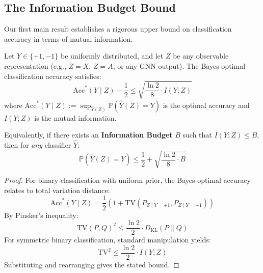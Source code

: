 \subsection{The Information Budget Bound}
\label{subsec:budget_bound}

Our first main result establishes a rigorous upper bound on classification accuracy in terms of mutual information.

\begin{theorem}
\label{thm:budget_pinsker}
Let $Y \in \{+1, -1\}$ be uniformly distributed, and let $Z$ be any observable representation (e.g., $Z = X$, $Z = A$, or any GNN output). The Bayes-optimal classification accuracy satisfies:
\begin{equation}
    \mathrm{Acc}^*(Y \mid Z) - \frac{1}{2} \leq \sqrt{\frac{\ln 2}{8} \cdot I(Y; Z)}
\end{equation}
where $\mathrm{Acc}^*(Y \mid Z) := \sup_{\hat{Y}(Z)} \mathbb{P}(\hat{Y}(Z) = Y)$ is the optimal accuracy and $I(Y; Z)$ is the mutual information.

Equivalently, if there exists an \textbf{Information Budget} $B$ such that $I(Y; Z) \leq B$, then for \emph{any} classifier $\hat{Y}$:
\begin{equation}
    \mathbb{P}(\hat{Y}(Z) = Y) \leq \frac{1}{2} + \sqrt{\frac{\ln 2}{8} \cdot B}
\end{equation}
\end{theorem}

\begin{proof}
For binary classification with uniform prior, the Bayes-optimal accuracy relates to total variation distance:
\begin{equation}
    \mathrm{Acc}^*(Y \mid Z) = \frac{1}{2}\left(1 + \mathrm{TV}(P_{Z \mid Y=+1}, P_{Z \mid Y=-1})\right)
\end{equation}
By Pinsker's inequality:
\begin{equation}
    \mathrm{TV}(P, Q)^2 \leq \frac{\ln 2}{2} \cdot D_{\mathrm{KL}}(P \| Q)
\end{equation}
For symmetric binary classification, standard manipulation yields:
\begin{equation}
    \mathrm{TV}^2 \leq \frac{\ln 2}{2} \cdot I(Y; Z)
\end{equation}
Substituting and rearranging gives the stated bound.
\end{proof}

